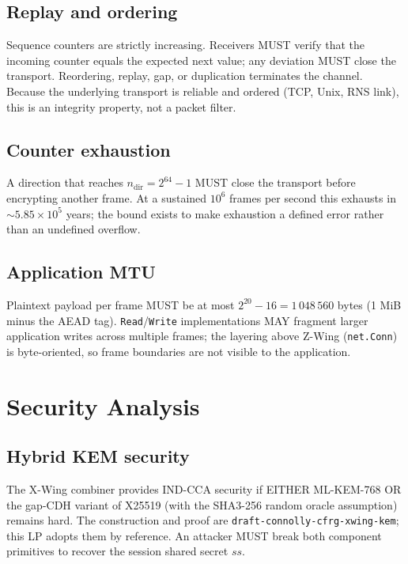 \documentclass[11pt,a4paper]{article}
\begin{document}
\subsection{Replay and ordering}

Sequence counters are strictly increasing. Receivers MUST verify that
the incoming counter equals the expected next value; any deviation MUST
close the transport. Reordering, replay, gap, or duplication terminates
the channel. Because the underlying transport is reliable and ordered
(TCP, Unix, RNS link), this is an integrity property, not a packet
filter.

\subsection{Counter exhaustion}

A direction that reaches $n_{\text{dir}} = 2^{64} - 1$ MUST close the
transport before encrypting another frame. At a sustained $10^6$ frames
per second this exhausts in $\sim 5.85 \times 10^5$ years; the bound
exists to make exhaustion a defined error rather than an undefined
overflow.

\subsection{Application MTU}

Plaintext payload per frame MUST be at most $2^{20} - 16 = 1\,048\,560$
bytes (1 MiB minus the AEAD tag). \texttt{Read}/\texttt{Write}
implementations MAY fragment larger application writes across multiple
frames; the layering above Z-Wing (\texttt{net.Conn}) is byte-oriented,
so frame boundaries are not visible to the application.

\section{Security Analysis}

\subsection{Hybrid KEM security}

The X-Wing combiner provides IND-CCA security if EITHER ML-KEM-768 OR
the gap-CDH variant of X25519 (with the SHA3-256 random oracle
assumption) remains hard. The construction and proof are
\texttt{draft-connolly-cfrg-xwing-kem}; this LP adopts them by
reference. An attacker MUST break both component primitives to
recover the session shared secret $ss$.
\end{document}
